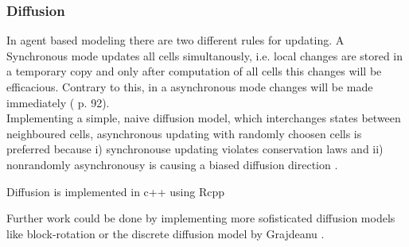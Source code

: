 \subsubsection{Diffusion}
In agent based modeling there are two different rules for updating.
A Synchronous mode updates all cells simultanously, i.e. local changes are stored in a temporary copy and only after computation of all cells this changes will be efficacious.
Contrary to this, in a asynchronous mode changes will be made immediately (\cite{Matthies2002} p. 92).\\
Implementing a simple, naive diffusion model, which interchanges states between neighboured cells, asynchronous updating with randomly choosen cells is preferred because i) synchronouse updating violates conservation laws and ii) nonrandomly asynchronousy is causing a biased diffusion direction \cite{Bandman1999}.
\begin{algorithm}
  \caption{Diffusion is implemented in c++ using Rcpp}
  \SetAlgoLined
\end{algorithm}
Further work could be done by implementing more sofisticated diffusion models like block-rotation \cite{Bandman1999} or the discrete diffusion model by Grajdeanu \cite{Grajdeanu2007}.
